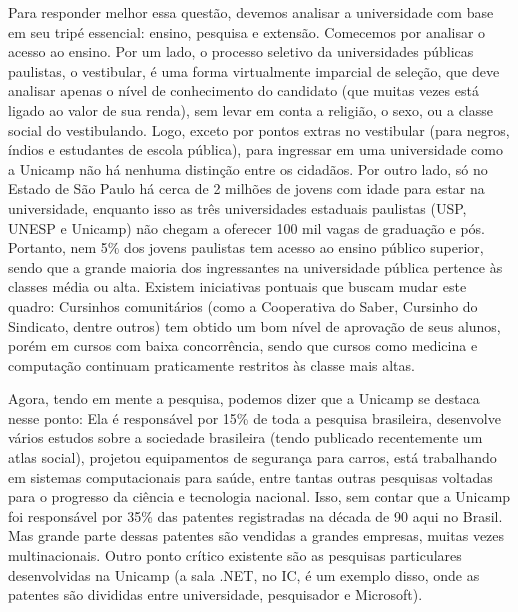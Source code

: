 Para responder melhor essa questão, devemos analisar a universidade com base em
seu tripé essencial: ensino, pesquisa e extensão. Comecemos por analisar
o acesso ao ensino. Por um lado, o processo seletivo da universidades públicas
paulistas, o vestibular, é uma forma virtualmente imparcial de seleção, que deve
analisar apenas o nível de conhecimento do candidato (que muitas vezes está
ligado ao valor de sua renda), sem levar em conta a religião, o sexo, ou
a classe social do vestibulando. Logo, exceto por pontos extras no vestibular
(para negros, índios e estudantes de escola pública), para ingressar em uma
universidade como a Unicamp não há nenhuma distinção entre os cidadãos. Por
outro lado, só no Estado de São Paulo há cerca de 2 milhões de jovens com idade
para estar na universidade, enquanto isso as três universidades estaduais
paulistas (USP, UNESP e Unicamp) não chegam a oferecer 100 mil vagas de
graduação e pós. Portanto, nem 5\% dos jovens paulistas tem acesso ao ensino
público superior, sendo que a grande maioria dos ingressantes na universidade
pública pertence às classes média ou alta. Existem iniciativas pontuais que
buscam mudar este quadro: Cursinhos comunitários (como a Cooperativa do Saber,
Cursinho do Sindicato, dentre outros) tem obtido um bom nível de aprovação de
seus alunos, porém em cursos com baixa concorrência, sendo que cursos como
medicina e computação continuam praticamente restritos às classe mais altas.

Agora, tendo em mente a pesquisa, podemos dizer que a Unicamp se destaca nesse
ponto: Ela é responsável por 15\% de toda a pesquisa brasileira, desenvolve
vários estudos sobre a sociedade brasileira (tendo publicado recentemente um
atlas social), projetou equipamentos de segurança para carros, está trabalhando
em sistemas computacionais para saúde, entre tantas outras pesquisas voltadas
para o progresso da ciência e tecnologia nacional. Isso, sem contar que
a Unicamp foi responsável por 35\% das patentes registradas na década de 90 aqui
no Brasil. Mas grande parte dessas patentes são vendidas a grandes empresas,
muitas vezes multinacionais. Outro ponto crítico existente são as pesquisas
particulares desenvolvidas na Unicamp (a sala .NET, no IC, é um exemplo disso,
onde as patentes são divididas entre universidade, pesquisador e Microsoft).

